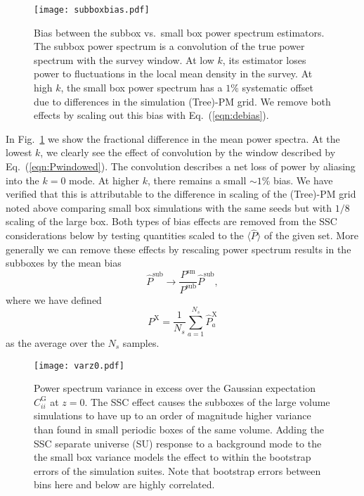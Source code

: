 \documentclass[prd,twocolumn,amsmath,amssymb,floatfix,superscriptaddress]{revtex4-1}
\begin{document}
\begin{figure}[t]
    \centering
    \texttt{[image: subboxbias.pdf]}
    \caption{\footnotesize Bias between the subbox vs.\ small box  power spectrum estimators.
    The subbox power spectrum is a convolution of the true power spectrum with the survey window.  At low $k$, its estimator loses power to fluctuations in the local mean density in the survey.  At high $k$, the small box power spectrum has a $1\%$ systematic offset due to differences
    in the simulation (Tree)-PM grid.   We remove both effects by scaling out this bias with
    Eq.~(\ref{eqn:debias}).}
    \label{fig:bias}
\end{figure}


In Fig.~\ref{fig:bias} we show the fractional difference in the mean power spectra.     At the lowest $k$, we clearly see the
effect of convolution by the window described by Eq.~(\ref{eqn:Pwindowed}).  
The convolution describes a net loss of power by aliasing into the $k=0$ mode.   At higher $k$, there remains a small $\sim 1\%$ bias.   {We have
verified that this is attributable to the difference in scaling of the (Tree)-PM grid noted above comparing small box simulations with the same seeds but with  $1/8$ scaling of the large box.}
Both types of bias effects are removed from the SSC 
considerations below by testing quantities scaled to the $\langle \hat P\rangle$ of the given set.  
More generally we can remove these effects by rescaling power spectrum
results in the subboxes by the mean bias
\begin{equation}
\hat P^\text{sub} \rightarrow
\frac{  P^\text{sm}}{  P^\text{sub}} \hat P^{\text{sub}},
\label{eqn:debias}
\end{equation}
where we have defined 
\begin{equation}
P^\text{X} = \frac{1}{N_s} \sum_{a=1}^{N_s}  \hat P^\text{X}_a
\end{equation}
as the average over the $N_s$ samples.



\begin{figure}[t]
    \centering
    \texttt{[image: varz0.pdf]}
    \caption{\footnotesize Power spectrum variance in excess over the Gaussian
    expectation $C_{ii}^\text{G}$ at $z=0$.   The SSC effect causes the subboxes of the large volume
    simulations to have up to an order of magnitude higher variance than found in small
    periodic boxes of the same volume.  Adding the SSC separate universe (SU) response
    to a background mode to the the small box variance models the effect to within the
    bootstrap errors of the simulation suites. Note that bootstrap errors between bins here and below are highly correlated. }
    \label{fig:variance}
\end{figure}
\end{document}
